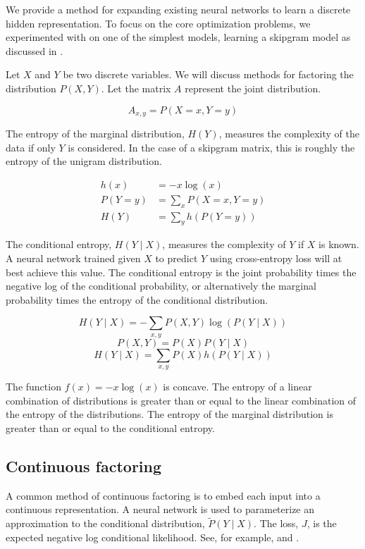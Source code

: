 \documentclass[11pt,letterpaper]{article}
\begin{document}
We provide a method for expanding existing neural networks to learn a discrete hidden representation. To focus on the core optimization problems, we experimented with on one of the simplest models, learning a skipgram model as discussed in \cite{Mikolov1301} \cite{MikolovSCCD13}.

Let $X$ and $Y$ be two discrete variables. We will discuss methods for factoring the distribution $P(X,Y)$. Let the matrix $A$ represent the joint distribution.

$$A_{x,y}=P(X=x, Y=y)$$

The entropy of the marginal distribution, $H(Y)$, measures the complexity of the data if only $Y$ is considered. In the case of a skipgram matrix, this is roughly the entropy of the unigram distribution.

\begin{align*}
h(x) &= -x \log(x) \\
P(Y=y) &= \sum_x P(X=x, Y=y) \\
H(Y) &=  \sum_y h(P(Y=y))
\end{align*}

The conditional entropy, $H(Y \mid X)$, measures the complexity of $Y$ if $X$ is known. A neural network trained given $X$ to predict $Y$ using cross-entropy loss will at best achieve this value. The conditional entropy is the joint probability times the negative log of the conditional probability, or alternatively the marginal probability times the entropy of the conditional distribution.

$$H(Y \mid X)=-\sum_{x,y} P(X, Y) \log(P(Y \mid X)) $$
$$P(X,Y) = P(X) P(Y \mid X)$$
$$H(Y \mid X)= \sum_{x,y}  P(X) h(P(Y \mid X))$$

The function $f(x)=-x \log(x)$ is concave. The entropy of a linear combination of distributions is greater than or equal to the linear combination of the entropy of the distributions. The entropy of the marginal distribution is greater than or equal to the conditional entropy.

\subsection{Continuous factoring}

A common method of continuous factoring is to embed each input into a continuous representation. A neural network is used to parameterize an approximation to the conditional distribution, $\tilde{P}(Y \mid X)$. The loss, $J$, is the expected negative log conditional likelihood. See, for example, \cite{MikolovSCCD13} and \cite{Mikolov1301}. 
\end{document}
